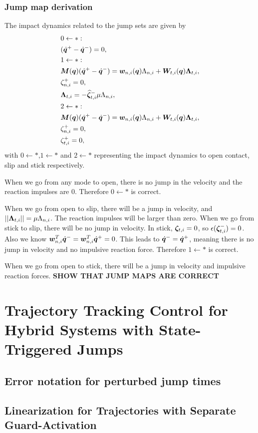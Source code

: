 \documentclass[../DC2017114Bouma.tex]{subfiles}
\begin{document}
\subsection{Jump map derivation}\label{app:jumpmaps}
The impact dynamics related to the jump sets are given by
\begin{align}
&0\leftarrow \ast:\nonumber\\
&(\dot{{\boldsymbol{q}}}^+ - \dot{{\boldsymbol{q}}}^-) = 0,\label{eq:appjump1}\\
&1\leftarrow\ast:\nonumber\\
&{\boldsymbol{M}}({\boldsymbol{q}})(\dot{{\boldsymbol{q}}}^+ - \dot{{\boldsymbol{q}}}^-) = {\boldsymbol{w}}_{n,i}({\boldsymbol{q}})\Lambda_{n,i} + {\boldsymbol{W}}_{t,i}({\boldsymbol{q}})\boldsymbol{\Lambda}_{t,i},\label{eq:appjump2}\\
&\zeta_{n,i}^+=0,\label{eq:appjump3}\\
&\boldsymbol{\Lambda}_{t,i} = -\widehat{\boldsymbol{\zeta}}^-_{t,i}\mu\Lambda_{n,i},\label{eq:appjump4}\\
&2\leftarrow \ast:\nonumber\\
&{\boldsymbol{M}}({\boldsymbol{q}})(\dot{{\boldsymbol{q}}}^+ - \dot{{\boldsymbol{q}}}^-) = {\boldsymbol{w}}_{n,i}({\boldsymbol{q}})\Lambda_{n,i} + {\boldsymbol{W}}_{t,i}({\boldsymbol{q}})\boldsymbol{\Lambda}_{t,i},\label{eq:appjump5}\\
&\zeta_{n,i}^+=0,\label{eq:appjump6}\\
&\zeta_{t,i}^+= 0,\label{eq:appjump7}
\end{align}
with $0\leftarrow\ast$,$1\leftarrow\ast$ and $2\leftarrow\ast$ representing the impact dynamics to open contact, slip and stick respectively. 

When we go from any mode to open, there is no jump in the velocity and the reaction impulses are 0. Therefore $0\leftarrow \ast$ is correct.

When we go from open to slip, there will be a jump in velocity, and $||\boldsymbol{\Lambda}_{t,i}|| = \mu\Lambda_{n,i}$. The reaction impulses will be larger than zero. When we go from stick to slip, there will be no jump in velocity. In stick, $\boldsymbol{\zeta}_{t,i} =0$, so $\epsilon(\boldsymbol{\zeta}^-_{t,i}) = 0$. Also we know ${\boldsymbol{w}}_{n,i}^T\dot{{\boldsymbol{q}}}^- = {\boldsymbol{w}}_{n,i}^T\dot{{\boldsymbol{q}}}^+ = 0 $. This leads to $\dot{{\boldsymbol{q}}}^- = \dot{{\boldsymbol{q}}}^+$, meaning there is no jump in velocity and no impulsive reaction force. Therefore $1\leftarrow \ast$ is correct.

When we go from open to stick, there will be a jump in velocity and impulsive reaction forces.
\textbf{SHOW THAT JUMP MAPS ARE CORRECT}

\cleartooddpage
\chapter{Trajectory Tracking Control for Hybrid Systems with State-Triggered Jumps}
\cite{Rijnen2017}
\section{Error notation for perturbed jump times}
\section{Linearization for Trajectories with Separate Guard-Activation}
\end{document}
